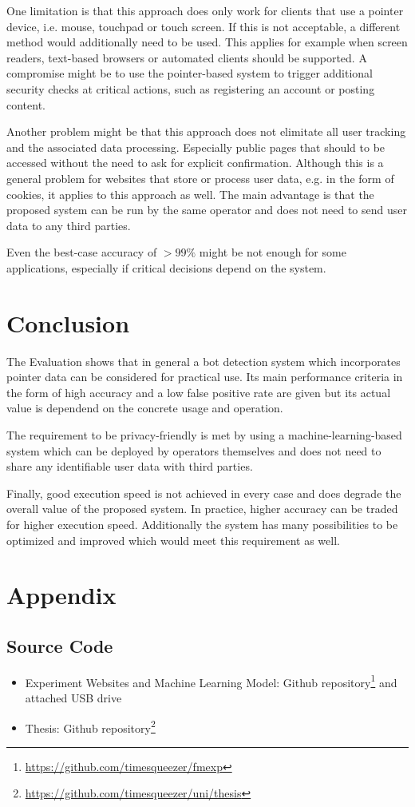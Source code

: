 \documentclass[
    fontsize=12pt,
    headings=small,
    parskip=half,           %
    bibliography=totoc,
    numbers=noenddot,       %
    open=any,               %
    final                   %
]{scrreprt}
\begin{document}
One limitation is that this approach does only work for clients that use a pointer device, i.e. mouse, touchpad or touch screen. If this is not acceptable, a different method would additionally need to be used. This applies for example when screen readers, text-based browsers or automated clients should be supported. A compromise might be to use the pointer-based system to trigger additional security checks at critical actions, such as registering an account or posting content.

Another problem might be that this approach does not elimitate all user tracking and the associated data processing. Especially public pages that should to be accessed without the need to ask for explicit confirmation. Although this is a general problem for websites that store or process user data, e.g. in the form of cookies, it applies to this approach as well. The main advantage is that the proposed system can be run by the same operator and does not need to send user data to any third parties.

Even the best-case accuracy of $>99\%$ might be not enough for some applications, especially if critical decisions depend on the system.

\chapter{Conclusion}

The Evaluation shows that in general a bot detection system which incorporates pointer data can be considered for practical use. Its main performance criteria in the form of high accuracy and a low false positive rate are given but its actual value is dependend on the concrete usage and operation.

The requirement to be privacy-friendly is met by using a machine-learning-based system which can be deployed by operators themselves and does not need to share any identifiable user data with third parties.

Finally, good execution speed is not achieved in every case and does degrade the overall value of the proposed system. In practice, higher accuracy can be traded for higher execution speed. Additionally the system has many possibilities to be optimized and improved which would meet this requirement as well.

\begin{raggedright}
  \printbibliography
\end{raggedright}

\chapter*{Appendix}

\section*{Source Code}

\begin{itemize}
	\item Experiment Websites and Machine Learning Model: Github repository\footnote{\url{https://github.com/timesqueezer/fmexp}} and attached USB drive
	\item Thesis: Github repository\footnote{\url{https://github.com/timesqueezer/uni/thesis}}
\end{itemize}
\end{document}
